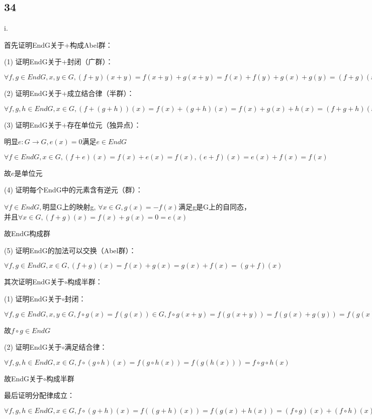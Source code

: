 \documentclass[UTF8]{ctexart}
\begin{document}
\subsection*{34}

i.

首先证明EndG关于+构成Abel群：

(1) 证明EndG关于+封闭（广群）：

$\forall f, g\in EndG, x, y\in G, (f + y)(x + y) = f(x + y) + g(x + y) = f(x) + f(y) + g(x) + g(y) = (f + g)(x) + (f + g)(y)$

(2) 证明EndG关于+成立结合律（半群）：

$\forall f, g, h\in EndG, x\in G, (f + (g + h))(x) = f(x) + (g + h)(x) = f(x) + g(x) + h(x) = (f + g + h)(x)$

(3) 证明EndG关于+存在单位元（独异点）：

明显$e:G\rightarrow G, e(x) = 0$满足$e\in EndG$

$\forall f\in EndG, x\in G, (f + e)(x) = f(x) + e(x) = f(x), (e + f)(x) = e(x) + f(x) = f(x)$

故$e$是单位元

(4) 证明每个EndG中的元素含有逆元（群）：

$\forall f\in EndG, $明显G上的映射g, $\forall x\in G, g(x) = -f(x)$满足g是G上的自同态，并且$\forall x\in G, (f + g)(x) = f(x) + g(x) = 0 = e(x)$

故EndG构成群

(5) 证明EndG的加法可以交换（Abel群）：

$\forall f, g\in EndG, x\in G, (f + g)(x) = f(x) + g(x) = g(x) + f(x) = (g + f)(x)$

其次证明EndG关于$\circ$构成半群：

(1) 证明EndG关于$\circ$封闭：

$\forall f, g\in EndG, x, y\in G, f\circ g(x) = f(g(x))\in G, f\circ g(x + y) = f(g(x + y)) = f(g(x) + g(y)) = f(g(x)) + f(g(y)) = f\circ g(x) + f\circ g(y)$

故$f\circ g\in EndG$

(2) 证明EndG关于$\circ$满足结合律：

$\forall f, g, h\in EndG, x\in G, f\circ (g\circ h)(x) = f(g\circ h(x)) = f(g(h(x))) = f\circ g\circ h(x)$

故EndG关于$\circ$构成半群

最后证明分配律成立：

$\forall f, g, h\in EndG, x\in G, f\circ(g + h)(x) = f((g + h)(x)) = f(g(x) + h(x)) = (f\circ g)(x) + (f\circ h)(x) = (f\circ g + f\circ h)(x)$
\end{document}
